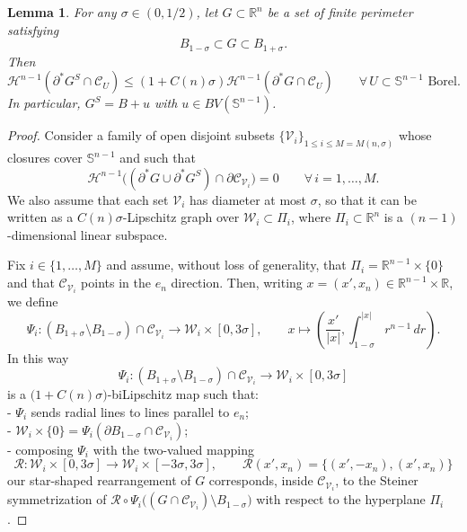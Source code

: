 \documentclass[reqno,11pt]{amsart}
\makeatletter
\def\sz{\sigma}
\newcommand{\R}{\mathbb R}
\newtheorem{lem}[thm]{Lemma}%
\numberwithin{equation}{section}
\theoremstyle{remark}
\makeatother
\begin{document}
\begin{lem}\label{rearrange G}
For any $\sz \in (0,1/2)$, let $G\subset \mathbb R^n$ be a set of finite perimeter satisfying
$$B_{1-\sz}\subset G\subset B_{1+\sz}. $$
Then  
$$\mathscr H^{n-1}(\partial^*G^S\cap\mathcal C_U)\le (1+C(n)\sz) \mathscr H^{n-1}(\partial^*G\cap\mathcal C_U)
\qquad \forall\, U\subset \mathbb S^{n-1} \text{ Borel.}$$
In particular,   $G^S=B+u$ with $u\in BV(\mathbb S^{n-1})$. 
\end{lem}
\begin{proof}
Consider a  family of open disjoint subsets $\{\mathcal V_i\}_{1\leq i \leq M=M(n,\sigma)}$ whose closures cover  $\mathbb S^{n-1}$ and such that
\begin{equation}
    \label{eq:pG V}
    \mathscr{H}^{n-1}\big((\partial^*G \cup \partial^*G^S) \cap \partial \mathcal{C}_{\mathcal V_i}\big)=0\qquad \forall\,i=1,\ldots,M.
\end{equation}
We also assume that each set $\mathcal V_i$ has diameter at most $\sz$, 
so that it can be written as a $C(n)\sz$-Lipschitz graph over $\mathcal W_i\subset \Pi_i$, where $\Pi_i\subset \R^n$ is a $(n-1)$-dimensional linear subspace. 

Fix $i \in \{1,\ldots,M\}$ and assume, without loss of generality, that $\Pi_i=\R^{n-1}\times \{0\}$ and that $\mathcal C_{\mathcal V_i}$ points in the $e_n$ direction. Then, writing $x=(x',x_n) \in \R^{n-1}\times \R$, we define
$$\Psi_i : \left(B_{1+\sz}\setminus B _{1-\sz}\right)\cap \mathcal{C}_{\mathcal V_i} \to \mathcal W_i\times [0,3\sigma], \qquad x\mapsto \left(\frac{x'}{|x|},\int_{1-\sigma}^{|x|} r^{n-1}\, dr\right).$$
In this way
$$\Psi_i\colon   \left(B_{1+\sz}\setminus B _{1-\sz}\right)\cap \mathcal{C}_{\mathcal V_i} \to \mathcal W_i\times [0,3\sigma] $$
is a  $\big(1+C(n)\sz\big)$-biLipschitz map such that:\\
- $\Psi_i$ sends radial lines to lines parallel to $e_n$;\\
- $\mathcal W_i\times \{0\} =\Psi_i\left(\partial B_{1-\sigma}\cap \mathcal C_{\mathcal V_i}\right)$;\\
- composing $\Psi_i$ with the two-valued mapping
$$\mathcal R\colon \mathcal W_i\times [0,3\sigma] \to \mathcal W_i \times [-3\sigma,3\sigma], \qquad  \mathcal R(x', x_n)=\big\{(x', - x_n),(x',x_n)\big\} $$
our star-shaped rearrangement of $G$ corresponds, inside $\mathcal C_{\mathcal V_i}$, to the Steiner symmetrization of $\mathcal R\circ \Psi_i\big((G \cap \mathcal C_{\mathcal V_i})\setminus  B_{1-\sz}\big)$ with respect to the hyperplane $\Pi_i$. 


\end{proof}
\end{document}
